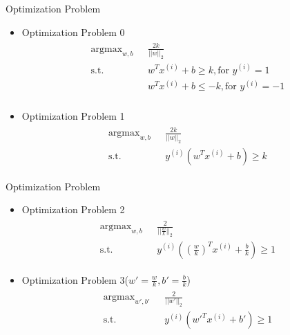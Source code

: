 \documentclass{beamer}
\begin{document}
\begin{frame}{Optimization Problem}
\begin{itemize}
\item  Optimization Problem 0
\begin{align}
\begin{split}
\text{argmax}_{w, b}\text{   }&\frac{2k}{||w||_2} \\
\text{s.t.} \text{   }&w^Tx^{(i)} + b \geq k, \text{for } y^{(i)} = 1\\
\text{   }&w^Tx^{(i)} + b \leq -k, \text{for } y^{(i)} = -1 \\
\end{split}
\end{align}
\item  Optimization Problem 1
\begin{align}
\begin{split}
\text{argmax}_{w, b}\text{   }&\frac{2k}{||w||_2} \\
\text{s.t.} \text{   }&y^{(i)}(w^Tx^{(i)} + b) \geq k
\end{split}
\end{align}
\end{itemize}
\end{frame}

\begin{frame}{Optimization Problem}
\begin{itemize}
\item  Optimization Problem 2
\begin{align}
\begin{split}
\text{argmax}_{w, b}\text{   }&\frac{2}{||\frac{w}{k}||_2} \\
\text{s.t.} \text{   }&y^{(i)}\left(\left(\frac{w}{k}\right)^Tx^{(i)} + \frac{b}{k}\right) \geq 1
\end{split}
\end{align}
\item  Optimization Problem 3($w' = \frac{w}{k}, b'=\frac{b}{k}$)
\begin{align}
\begin{split}
\text{argmax}_{w', b'}\text{   }&\frac{2}{||w'||_2} \\
\text{s.t.} \text{   }&y^{(i)}\left(w'^Tx^{(i)} + b'\right) \geq 1
\end{split}
\end{align}
\end{itemize}
\end{frame}
\end{document}
